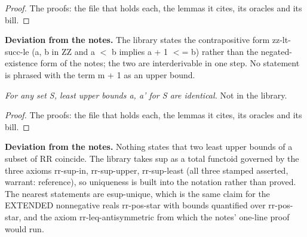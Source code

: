 \begin{proof}
%
The proofs: the file that holds each, the lemmas it cites, its oracles and its bill.
%
%
%
%
%
%
%
%
%
\end{proof}
%
\noindent\textbf{Deviation from the notes.} The library states the contrapositive form zz-lt-succ-le (a, b in ZZ and a $<$ b implies a + 1 $<$= b) rather than the negated-existence form of the notes; the two are interderivable in one step. No statement is phrased with the term m + 1 as an upper bound.
%
\renewcommand{\thethm}{1.9}
\begin{prop}\label{thm:calculus-1.9}
%
\textit{For any set S, least upper bounds a, a' for S are identical.}
%
Not in the library.
%
\end{prop}
%
\begin{proof}
%
The proofs: the file that holds each, the lemmas it cites, its oracles and its bill.
%
%
\end{proof}
%
\noindent\textbf{Deviation from the notes.} Nothing states that two least upper bounds of a subset of RR coincide. The library takes sup as a total functoid governed by the three axioms rr-sup-in, rr-sup-upper, rr-sup-least (all three stamped asserted, warrant: reference), so uniqueness is built into the notation rather than proved. The nearest statements are esup-unique, which is the same claim for the EXTENDED nonnegative reals rr-pos-star with bounds quantified over rr-pos-star, and the axiom rr-leq-antisymmetric from which the notes' one-line proof would run.
%
\renewcommand{\thethm}{1.11}
\begin{prop}\label{thm:rr-nested-intervals}
%
%
\end{prop}
